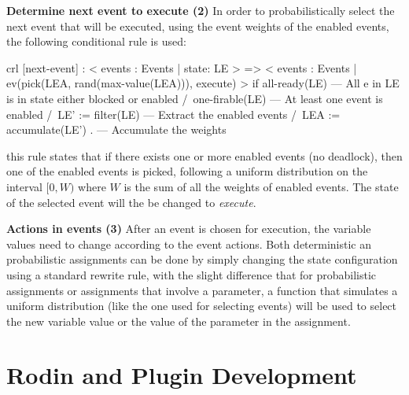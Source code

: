 \textbf{Determine next event to execute (2)} In order to probabilistically select the next event that will be executed, using the event weights of the enabled events, the following conditional rule is used:
\begin{maude}
crl [next-event] :  < events : Events | state: LE > => 
                    < events : Events | ev(pick(LEA, rand(max-value(LEA))), execute) >
if     all-ready(LE)              --- All e in LE is in state either blocked or enabled 
   /\  one-firable(LE)            --- At least one event is enabled 
   /\  LE' := filter(LE)          --- Extract the enabled events
   /\  LEA := accumulate(LE') .   --- Accumulate the weights 
\end{maude}
this rule states that if there exists one or more enabled events (no deadlock), then one of the enabled events is picked, following a uniform distribution on the interval $[0, W)$ where $W$ is the sum of all the weights of enabled events. The state of the selected event will the be changed to \textit{execute}.

\textbf{Actions in events (3)} After an event is chosen for execution, the variable values need to change according to the event actions. Both deterministic an probabilistic assignments can be done  by simply changing the state configuration using a standard rewrite rule, with the slight difference that for probabilistic assignments or assignments that involve a parameter, a function that simulates a uniform distribution (like the one used for selecting events) will be used to select the new variable value or the value of the parameter in the assignment.

\section{Rodin and Plugin Development}










